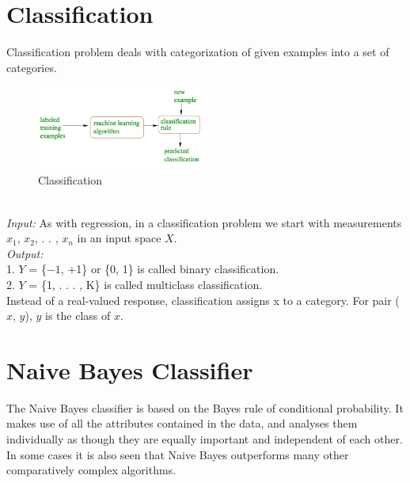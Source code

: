 
\section{Classification}


Classification problem deals with categorization of given examples into a set of categories. 
\begin{figure}[H]
  \begin{center}
    \includegraphics[width=0.5\textwidth]{classification.png}
    \caption{
      Classification}
  \end{center}
\end{figure}


\ 
\\{\itshape Input:} As with regression, in a classification problem we start with measurements {$x_1$, $x_2$, . . , $x_n$} in an input space $X$.
\\{\itshape Output:} \\
1. $Y$ = \{$-1$, +1\} or \{0, 1\} is called binary classification.\\
2. $Y$ = \{1, . . . , K\} is called multiclass classification.\\
Instead of a real-valued response, classification assigns x to a category. For pair ($x$, $y$), $y$ is the class of $x$.

\section{Naive Bayes Classifier}
The Naive Bayes classifier is based on the Bayes rule of conditional probability. It makes use of all the attributes contained in the data, and analyses them individually as though they are equally important and independent of each other. In some cases it is also seen that Naive Bayes outperforms many other comparatively complex algorithms.
